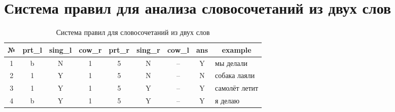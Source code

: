 \documentclass[main]{subfiles}
\begin{document}
\section{Система правил для анализа словосочетаний из двух слов}\label{app:A}
\begin{table}[!h]
	\begin{center}
		\captionsetup{format=hang,labelsep = endash, singlelinecheck=false}
	\caption{Система правил для словосочетаний из двух слов}
		\begin{tabular}{|c|c|c|c|c|c|c|c|l|}
			\hline
			\textbf{№} & \textbf{prt\_l} &\textbf{ sing\_l}  & \textbf{cow\_r} & \textbf{prt\_r }& \textbf{sing\_r} & \textbf{cow\_l} & \textbf{ans}  & \multicolumn{1}{c|}{\textbf{example}} \\ \hline
			1 & b & N & 1 & 5 & N & --  & Y  & мы делали \\ \hline
			2 &  1 &Y & 1 & 5 & N & -- & N & собака лаяли\\ \hline
			3 & 1 & Y & 1 & 5 & Y & -- & Y & самолёт летит\\ \hline 
			4 & b & Y & 1 & 5 & Y & -- & Y & я делаю \\ \hline
		\end{tabular}
	\end{center}
\end{table}
\end{document}
